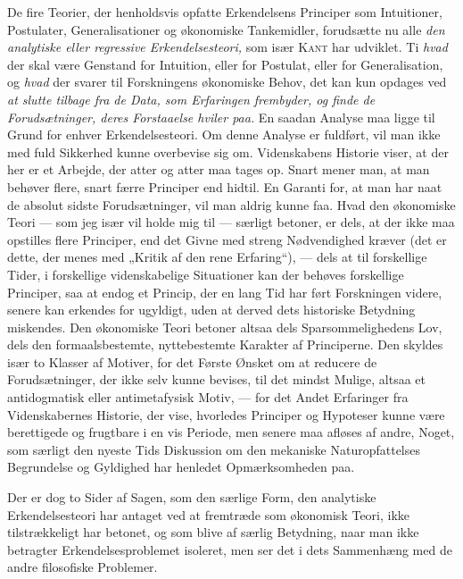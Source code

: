 \documentclass[12pt,a4paper,openany]{book}
\newcommand{\opage}[1]{\marginnote{\footnotesize\textit{[#1]}}}
\begin{document}
De fire Teorier, der henholdsvis opfatte Erkendelsens Principer som
Intuitioner, Postulater, Generalisationer og økonomiske Tankemidler, forudsætte
nu alle \textit{den analytiske eller regressive Erkendelsesteori,} som især
\textsc{Kant} har udviklet. Ti \textit{hvad} der skal være Genstand for
Intuition, eller for Postulat, eller for Generalisation, og \textit{hvad} der
svarer til Forskningens økonomiske Behov, det kan kun opdages ved \textit{at
slutte tilbage fra de Data, som Erfaringen frembyder, og finde de
Forudsætninger, deres Forstaaelse hviler paa.} En saadan Analyse maa ligge til
Grund for enhver Erkendelsesteori. Om denne Analyse er fuldført, vil man ikke
med fuld Sikkerhed kunne overbevise sig om. Videnskabens Historie viser, at der
her er et Arbejde, der atter og atter maa tages op. Snart mener man, at man
behøver flere, snart færre Principer end hidtil. En Garanti for, at man har
naat de absolut sidste Forudsætninger, vil man aldrig kunne faa. Hvad den
økonomiske Teori --- som jeg især vil holde mig til --- særligt betoner, er
dels, at der ikke maa opstilles flere Principer, end det Givne med streng
Nødvendighed kræver (det er dette, der menes med „Kritik af den rene
Erfaring“), --- dels at til forskellige Tider, i forskellige videnskabelige
Situationer kan der behøves forskellige Principer, saa at endog et Princip, der
en lang Tid har ført Forskningen videre, senere kan erkendes for ugyldigt, uden
at derved dets historiske Betydning miskendes. Den økonomiske Teori betoner
altsaa dels Sparsommelighedens Lov, dels den formaalsbestemte, nyttebestemte
Karakter af Principerne. Den skyldes især to Klasser af Motiver, for det Første
Ønsket om at reducere de Forudsætninger, der ikke selv kunne bevises,
\opage{34}til det mindst Mulige, altsaa et antidogmatisk eller antimetafysisk
Motiv, --- for det Andet Erfaringer fra Videnskabernes Historie, der vise,
hvorledes Principer og Hypoteser kunne være berettigede og frugtbare i en vis
Periode, men senere maa afløses af andre, Noget, som særligt den nyeste Tids
Diskussion om den mekaniske Naturopfattelses Begrundelse og Gyldighed har
henledet Opmærksomheden paa.

Der er dog to Sider af Sagen, som den særlige Form, den analytiske
Erkendelsesteori har antaget ved at fremtræde som økonomisk Teori, ikke
tilstrækkeligt har betonet, og som blive af særlig Betydning, naar man ikke
betragter Erkendelsesproblemet isoleret, men ser det i dets Sammenhæng med de
andre filosofiske Problemer.
\end{document}
